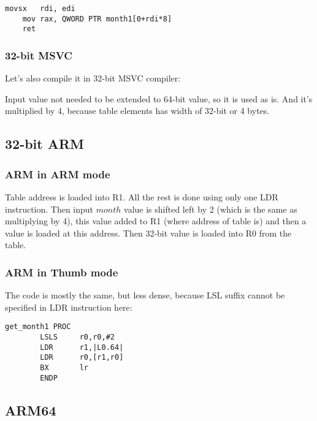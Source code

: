 \begin{lstlisting}[caption=\Optimizing GCC 4.9 x64]
	movsx	rdi, edi
	mov	rax, QWORD PTR month1[0+rdi*8]
	ret
\end{lstlisting}

\subsubsection{32-bit MSVC}

Let's also compile it in 32-bit MSVC compiler:



Input value not needed to be extended to 64-bit value, so it is used as is.
And it's multiplied by 4, because table elements has width of 32-bit or 4 bytes.

\subsection{32-bit ARM}

\subsubsection{ARM in ARM mode}



Table address is loaded into R1.
All the rest is done using only one LDR instruction.
Then input $month$ value is shifted left by 2 (which is the same as multiplying by 4), this value added
to R1 (where address of table is) and then a value is loaded at this address.
Then 32-bit value is loaded into R0 from the table.

\subsubsection{ARM in Thumb mode}

The code is mostly the same, but less dense, because LSL suffix cannot be specified in LDR instruction here:

\begin{lstlisting}
get_month1 PROC
        LSLS     r0,r0,#2
        LDR      r1,|L0.64|
        LDR      r0,[r1,r0]
        BX       lr
        ENDP
\end{lstlisting}

\subsection{ARM64}

